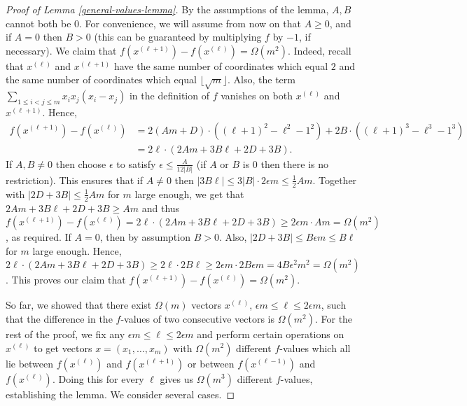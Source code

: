 \documentclass[10pt,a4paper]{amsart}
\begin{document}
\begin{proof}[Proof of Lemma \ref{general-values-lemma}]
    By the assumptions of the lemma, $A,B$ cannot both be $0$. 
    For convenience, we will assume from now on that $A \geq 0$, and if $A = 0$ then $B > 0$ (this can be guaranteed by multiplying $f$ by $-1$, if necessary).
    We claim that $f(x^{(\ell+1)}) - f(x^{(\ell)}) = \Omega(m^2)$. 
    Indeed, recall that $x^{(\ell)}$ and $x^{(\ell+1)}$ have the same number of coordinates which equal $2$ and the same number of coordinates which equal $\lfloor \sqrt{m} \rfloor$. Also, the term $\sum_{1 \leq i < j \leq m} x_i x_j (x_i - x_j)$ in the definition of $f$ vanishes on both $x^{(\ell)}$ and $x^{(\ell+1)}$. Hence,
    \begin{align*}
        f(x^{(\ell+1)}) - f(x^{(\ell)})   
        &= 2(Am+D)\cdot ((\ell+1)^2 - \ell^2 - 1^2) + 2B \cdot ((\ell+1)^3 - \ell^3 - 1^3) \\
        &= 2\ell \cdot (2Am + 3B\ell + 2D + 3B).
    \end{align*}
    If $A,B \neq 0$ then choose $\epsilon$ to satisfy $\epsilon \leq \frac{A}{12|B|}$ (if $A$ or $B$ is 0 then there is no restriction).
    This ensures that if $A \neq 0$ then
    $|3B\ell| \leq 3|B| \cdot 2 \epsilon m \leq \frac{1}{2}Am$. Together with 
    $|2D + 3B| \leq \frac{1}{2}Am$ for $m$ large enough, we get that
    $2Am + 3B\ell + 2D + 3B \geq Am$ and thus 
    $f(x^{(\ell+1)}) - f(x^{(\ell)}) = 2\ell \cdot (2Am + 3B\ell + 2D + 3B) \geq 2 \epsilon m \cdot Am = \Omega(m^2)$, as required.
    If $A = 0$, then by assumption $B > 0$. Also, $|2D + 3B| \leq B \epsilon m \leq B\ell$ for $m$ large enough. Hence, $2\ell \cdot(2Am + 3B\ell + 2D + 3B) \geq 2\ell \cdot 2B\ell \geq
    2 \epsilon m \cdot 2B \epsilon m = 4B \epsilon^2 m^2 = \Omega(m^2)$.
    This proves our claim that $f(x^{(\ell+1)}) - f(x^{(\ell)}) = \Omega(m^2)$.

    So far, we showed that there exist $\Omega(m)$ vectors $x^{(\ell)}$, $\epsilon m \leq \ell \leq 2\epsilon m$, such that the difference in the $f$-values of two consecutive vectors is 
    $\Omega(m^2)$. 
	For the rest of the proof, we fix any $\epsilon m \leq \ell \leq 2\epsilon m$ 
    and perform certain operations on $x^{(\ell)}$ to get vectors $x = (x_1,\dots,x_m)$ with 
    $\Omega(m^2)$ different $f$-values which all lie between $f(x^{(\ell)})$ and $f(x^{(\ell+1)})$ or between $f(x^{(\ell-1)})$ and $f(x^{(\ell)})$. Doing this for every $\ell$ gives us $\Omega(m^3)$ different $f$-values, establishing the lemma. We consider several cases.


\end{proof}
\end{document}
